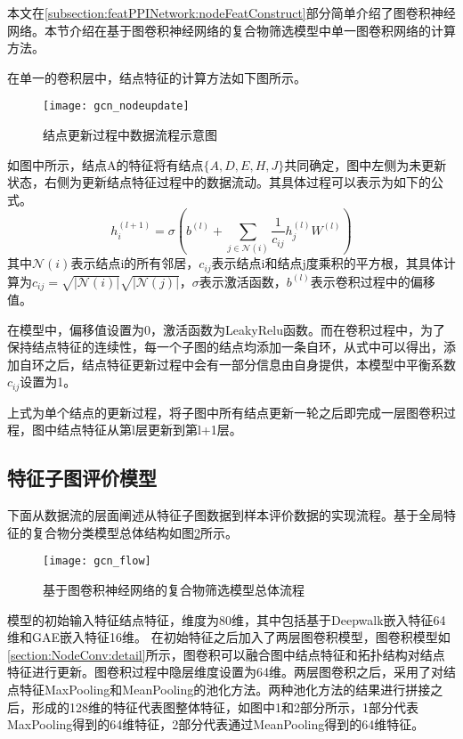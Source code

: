 本文在\ref{subsection:featPPINetwork:nodeFeatConstruct}部分简单介绍了图卷积神经网络。本节介绍在基于图卷积神经网络的复合物筛选模型中单一图卷积网络的计算方法。

在单一的卷积层中，结点特征的计算方法如下图所示。

\begin{figure}[htbp]
    \centering
    \texttt{[image: gcn\_nodeupdate]}
    \caption{结点更新过程中数据流程示意图}
    \label{fig:gcn_nodeupdate}
\end{figure}
如图中所示，结点A的特征将有结点$\{A,D,E,H,J\}$共同确定，图中左侧为未更新状态，右侧为更新结点特征过程中的数据流动。其具体过程可以表示为如下的公式。
\begin{equation}
    \label{equ:normalgcn}
    h_i^{(l+1)} = \sigma(b^{(l)} + \sum_{j\in\mathcal{N}(i)}\frac{1}{c_{ij}}h_j^{(l)}W^{(l)})
\end{equation}
其中$\mathcal{N}(i)$表示结点i的所有邻居，${c_{ij}}$表示结点i和结点j度乘积的平方根，其具体计算为$c_{ij} = \sqrt{|\mathcal{N}(i)|}\sqrt{|\mathcal{N}(j)|}$，$\sigma$表示激活函数，$b^{(l)}$表示卷积过程中的偏移值。

在模型中，偏移值设置为0，激活函数为LeakyRelu函数。而在卷积过程中，为了保持结点特征的连续性，每一个子图的结点均添加一条自环，从式中可以得出，添加自环之后，结点特征更新过程中会有一部分信息由自身提供，本模型中平衡系数${c_{ij}}$设置为1。

上式为单个结点的更新过程，将子图中所有结点更新一轮之后即完成一层图卷积过程，图中结点特征从第l层更新到第l+1层。

\subsection{特征子图评价模型}
\label{subsection:NodeConv:flow}

下面从数据流的层面阐述从特征子图数据到样本评价数据的实现流程。基于全局特征的复合物分类模型总体结构如图\ref{fig:gcn_flow}所示。
\begin{figure}[htbp]
    \centering
    \texttt{[image: gcn\_flow]}
    \caption{基于图卷积神经网络的复合物筛选模型总体流程}
    \label{fig:gcn_flow}
\end{figure}
模型的初始输入特征结点特征，维度为80维，其中包括基于Deepwalk嵌入特征64维和GAE嵌入特征16维。
在初始特征之后加入了两层图卷积模型，图卷积模型如\ref{section:NodeConv:detail}所示，图卷积可以融合图中结点特征和拓扑结构对结点特征进行更新。图卷积过程中隐层维度设置为64维。两层图卷积之后，采用了对结点特征MaxPooling和MeanPooling的池化方法。两种池化方法的结果进行拼接之后，形成的128维的特征代表图整体特征，如图中1和2部分所示，1部分代表MaxPooling得到的64维特征，2部分代表通过MeanPooling得到的64维特征。

